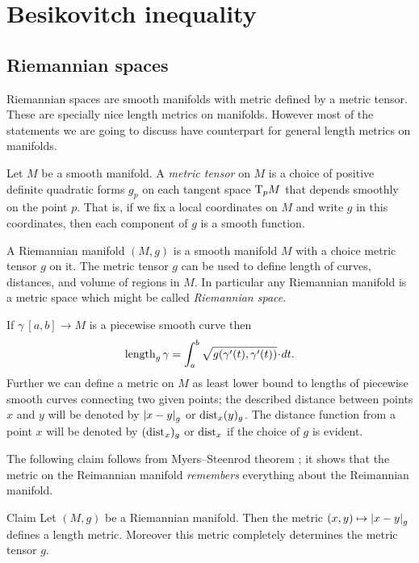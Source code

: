 \chapter{Besikovitch inequality} 


\section{Riemannian spaces}

Riemannian spaces are smooth manifolds with metric defined by a metric tensor.
These are specially nice length metrics on manifolds.
However most of the statements we are going to discuss have counterpart for general length metrics on manifolds.

Let $M$ be a smooth manifold.
A \emph{metric tensor} on $M$ is a choice of positive definite quadratic forms $g_p$ on each tangent space $\mathrm{T}_pM$ that depends smoothly on the point $p$.
That is, if we fix a local coordinates on $M$ and write $g$ in this coordinates, then each component of $g$ is a smooth function. 

A Riemannian manifold $(M,g)$ is a smooth manifold $M$ with a choice metric tensor $g$ on it.
The metric tensor $g$ can be used to define length of curves, distances, and volume of regions in $M$.
In particular any Riemannian manifold is a metric space which might be called \emph{Riemannian space}.


If $\gamma\:[a,b]\to M$ is a piecewise smooth curve then 
\[\length_g\gamma=\int_a^b\sqrt{g(\gamma'(t),\gamma'(t))}\cdot dt.\]
Further we can define a metric on $M$ as least lower bound to lengths of piecewise smooth curves connecting two given points;
the described distance between points $x$ and $y$ will be denoted by $\dist{x}{y}{g}$ or $\mathrm{dist}_x(y)_g$.
The distance function from a point $x$ will be denoted by $(\mathrm{dist}_x)_g$ or $\mathrm{dist}_x$ if the choice of $g$ is evident.

The following claim follows from Myers--Steenrod theorem \cite{myers-steenrod};
it shows that the metric on the Reimannian manifold {}\emph{remembers} everything about the Reimannian manifold.

\begin{thm}{Claim}
Let $(M,g)$ be a Riemannian manifold.
Then the metric $(x,y)\mapsto \dist{x}{y}{g}$ defines a length metric. Moreover this metric completely determines the metric tensor $g$.
\end{thm}

